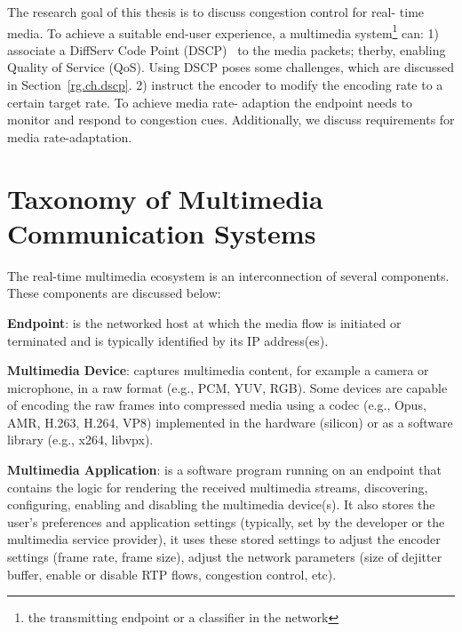 
The research goal of this thesis is to discuss congestion control for real-
time media. To achieve a suitable end-user experience, a multimedia
system\footnote{the transmitting endpoint or a classifier in the network} can:
1) associate a DiffServ Code Point (DSCP)~\cite{rfc2474} to the media packets;
therby, enabling Quality of Service (QoS). Using DSCP poses some challenges,
which are discussed in Section~\ref{rg.ch.dscp}. 2) instruct the encoder to
modify the encoding rate to a certain target rate. To achieve media rate-
adaption the endpoint needs to monitor and respond to congestion cues.
Additionally, we  discuss requirements for media rate-adaptation.


\section{Taxonomy of Multimedia Communication Systems}

The real-time multimedia ecosystem is an interconnection of several
components. These components are discussed below:

\textbf{Endpoint}: is the networked host at which the media flow is initiated
or terminated and is typically identified by its IP address(es).


\textbf{Multimedia Device}: captures multimedia content, for example a camera
or microphone, in a raw format (e.g., PCM, YUV, RGB). Some devices are capable
of encoding the raw frames into compressed media using a codec (e.g., Opus,
AMR, H.263, H.264, VP8) implemented in the hardware (silicon) or as a software
library (e.g., x264, libvpx).


\textbf{Multimedia Application}: is a software program running on an endpoint
that contains the logic for rendering the received multimedia streams,
discovering, configuring, enabling and disabling the multimedia device(s). It
also stores the user's preferences and application settings (typically, set by
the developer or the multimedia service provider), it uses these stored
settings to adjust the encoder settings (frame rate, frame size), adjust the
network parameters (size of dejitter buffer, enable or disable RTP flows,
congestion control, etc).

